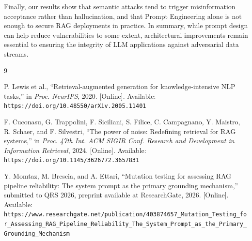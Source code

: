 \documentclass[
    a4paper,
    man,
    floatsintext
]{glossaPX2}
\begin{document}
Finally, our results show that semantic attacks tend to trigger misinformation acceptance rather than hallucination, and that Prompt Engineering alone is not enough to secure RAG deployments in practice. In summary, while prompt design can help reduce vulnerabilities to some extent, architectural improvements remain essential to ensuring the integrity of LLM applications against adversarial data streams.

\begin{thebibliography}{9}

P. Lewis et al., ``Retrieval-augmented generation for knowledge-intensive NLP tasks,'' in \textit{Proc. NeurIPS}, 2020. [Online]. Available: \nolinkurl{https://doi.org/10.48550/arXiv.2005.11401}

F. Cuconasu, G. Trappolini, F. Siciliani, S. Filice, C. Campagnano, Y. Maistro, R. Schaer, and F. Silvestri, ``The power of noise: Redefining retrieval for RAG systems,'' in \textit{Proc. 47th Int. ACM SIGIR Conf. Research and Development in Information Retrieval}, 2024. [Online]. Available: \nolinkurl{https://doi.org/10.1145/3626772.3657831}

Y. Momtaz, M. Brescia, and A. Ettari, ``Mutation testing for assessing RAG pipeline reliability: The system prompt as the primary grounding mechanism,'' submitted to QRS 2026, preprint available at ResearchGate, 2026. [Online]. Available: \nolinkurl{https://www.researchgate.net/publication/403874657_Mutation_Testing_for_Assessing_RAG_Pipeline_Reliability_The_System_Prompt_as_the_Primary_Grounding_Mechanism}

\end{thebibliography}
\end{document}
